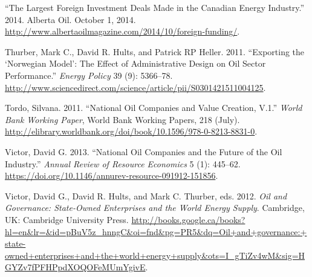 \documentclass[11pt,]{book}
\begin{document}
\leavevmode\hypertarget{ref-noauthor_largest_2014}{}%
``The Largest Foreign Investment Deals Made in the Canadian Energy Industry.'' 2014. Alberta Oil. October 1, 2014. \url{http://www.albertaoilmagazine.com/2014/10/foreign-funding/}.

\leavevmode\hypertarget{ref-thurber_exporting_2011}{}%
Thurber, Mark C., David R. Hults, and Patrick RP Heller. 2011. ``Exporting the `Norwegian Model': The Effect of Administrative Design on Oil Sector Performance.'' \emph{Energy Policy} 39 (9): 5366--78. \url{http://www.sciencedirect.com/science/article/pii/S0301421511004125}.

\leavevmode\hypertarget{ref-tordo_national_2011}{}%
Tordo, Silvana. 2011. ``National Oil Companies and Value Creation, V.1.'' \emph{World Bank Working Paper}, World Bank Working Papers, 218 (July). \url{http://elibrary.worldbank.org/doi/book/10.1596/978-0-8213-8831-0}.

\leavevmode\hypertarget{ref-victor_national_2013}{}%
Victor, David G. 2013. ``National Oil Companies and the Future of the Oil Industry.'' \emph{Annual Review of Resource Economics} 5 (1): 445--62. \url{https://doi.org/10.1146/annurev-resource-091912-151856}.

\leavevmode\hypertarget{ref-victor_oil_2012}{}%
Victor, David G., David R. Hults, and Mark C. Thurber, eds. 2012. \emph{Oil and Governance: State-Owned Enterprises and the World Energy Supply}. Cambridge, UK: Cambridge University Press. \url{http://books.google.ca/books?hl=en\&lr=\&id=pBuV5z_hnngC\&oi=fnd\&pg=PR5\&dq=Oil+and+governance:+state-owned+enterprises+and+the+world+energy+supply\&ots=I_gTiZv4wM\&sig=HGYZv7fPFHPpdXOQOFeMUmYgivE}.
\end{document}
